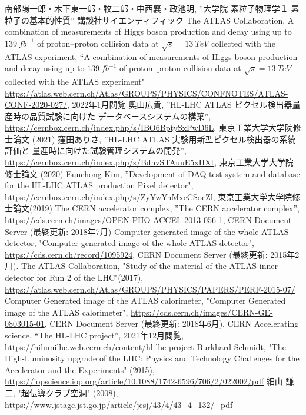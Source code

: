 \begin{thebibliography}{24}
南部陽一郎・木下東一郎・牧二郎・中西襄・政池明,
”大学院 素粒子物理学１ 素粒子の基本的性質”
講談社サイエンティフィック
The ATLAS Collaboration, A combination of measurements of Higgs boson production and decay using up to $139\ \si{fb^{-1}}$ of proton–proton collision data at $\sqrt{s} = 13\ \si{TeV}$ collected with the ATLAS experiment, “A combination of measurements of Higgs boson production and decay using up to $139\ \si{fb^{-1}}$ of proton–proton collision data at $\sqrt{s} = 13\ \si{TeV}$ collected with the ATLAS experiment" \url{https://atlas.web.cern.ch/Atlas/GROUPS/PHYSICS/CONFNOTES/ATLAS-CONF-2020-027/}, 2022年1月閲覧
奥山広貴, ”HL-LHC ATLAS ピクセル検出器量産時の品質試験に向けた データベースシステムの構築”,
\url{https://cernbox.cern.ch/index.php/s/IBO6BptySxPwD6L}, 東京工業大学大学院修士論文 (2021)
窪田ありさ, ”HL-LHC ATLAS 実験用新型ピクセル検出器の系統評価と 量産時に向けた試験管理システムの開発”,
\url{https://cernbox.cern.ch/index.php/s/BdhvSTAuuE5xHXt}, 東京工業大学大学院修士論文 (2020)
Eunchong Kim, ”Development of DAQ test system and database for the HL-LHC ATLAS production Pixel detector",
\url{https://cernbox.cern.ch/index.php/s/ZyYwYnMxeCSoeZl}, 東京工業大学大学院修士論文(2019)
The CERN accelerator complex, ”The CERN accelerator complex”, \url{https://cds.cern.ch/images/OPEN-PHO-ACCEL-2013-056-1}, CERN Document Server (最終更新: 2018年7月)
Computer generated image of the whole ATLAS detector, "Computer generated image of the whole ATLAS detector", \url{https://cds.cern.ch/record/1095924}, CERN Document Server (最終更新: 2015年2月).
The ATLAS Collaboration, "Study of the material of the ATLAS inner detector for Run 2 of the LHC"(2017), \url{https://atlas.web.cern.ch/Atlas/GROUPS/PHYSICS/PAPERS/PERF-2015-07/}
Computer Generated image of the ATLAS calorimeter, "Computer Generated image of the ATLAS calorimeter", \url{https://cds.cern.ch/images/CERN-GE-0803015-01}, CERN Document Server (最終更新: 2018年6月).
CERN Accelerating science, “The HL-LHC project”, 2021年12月閲覧,
\url{https://hilumilhc.web.cern.ch/content/hl-lhc-project}
Burkhard Schmidt, "The High-Luminosity upgrade of the LHC: Physics and Technology Challenges for the Accelerator and the Experiments" (2015),
\url{https://iopscience.iop.org/article/10.1088/1742-6596/706/2/022002/pdf}
細山 謙二, "超伝導クラブ空洞" (2008), \url{https://www.jstage.jst.go.jp/article/jcsj/43/4/43_4_132/_pdf}

\end{thebibliography}
